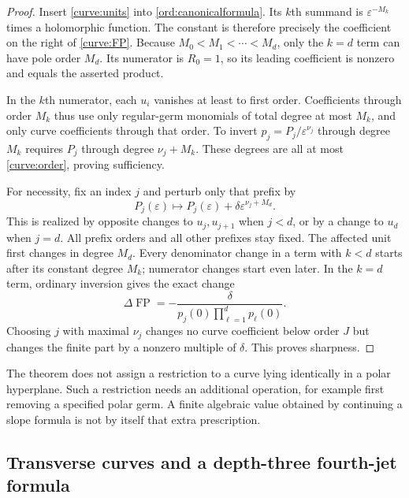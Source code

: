 \documentclass[11pt,letterpaper]{article}
\numberwithin{equation}{section}
\theoremstyle{definition}
\theoremstyle{remark}
\DeclareMathOperator{\FP}{FP}
\newcommand{\eps}{\varepsilon}
\begin{document}
\begin{proof}
Insert \eqref{curve:units} into \eqref{ord:canonicalformula}. Its $k$th
summand is $\eps^{-M_k}$ times a holomorphic function. The constant is
therefore precisely the coefficient on the right of \eqref{curve:FP}.
Because $M_0<M_1<\cdots<M_d$, only the $k=d$ term can have pole order
$M_d$. Its numerator is $R_0=1$, so its leading coefficient is nonzero
and equals the asserted product.

In the $k$th numerator, each $u_i$ vanishes at least to first order.
Coefficients through order $M_k$ thus use only regular-germ monomials
of total degree at most $M_k$, and only curve coefficients through
that order. To invert $p_j=P_j/\eps^{\nu_j}$ through degree $M_k$
requires $P_j$ through degree $\nu_j+M_k$. These degrees are all at
most \eqref{curve:order}, proving sufficiency.

For necessity, fix an index $j$ and perturb only that prefix by
\begin{equation}\label{curve:perturb}
 P_j(\eps)\longmapsto P_j(\eps)+
                       \delta\eps^{\nu_j+M_d}.
\end{equation}
This is realized by opposite changes to $u_j,u_{j+1}$ when $j<d$,
or by a change to $u_d$ when $j=d$. All prefix orders and all other
prefixes stay fixed. The affected unit first changes in degree $M_d$.
Every denominator change in a term with $k<d$ starts after its constant
degree $M_k$; numerator changes start even later. In the $k=d$ term,
ordinary inversion gives the exact change
\begin{equation}\label{curve:sharpchange}
 \Delta\FP=-\frac{\delta}
 {p_j(0)\prod_{\ell=1}^d p_\ell(0)}.
\end{equation}
Choosing $j$ with maximal $\nu_j$ changes no curve coefficient below
order $J$ but changes the finite part by a nonzero multiple of
$\delta$. This proves sharpness.
\end{proof}

The theorem does not assign a restriction to a curve lying identically
in a polar hyperplane. Such a restriction needs an additional
operation, for example first removing a specified polar germ. A
finite algebraic value obtained by continuing a slope formula is not
by itself that extra prescription.

\subsection{Transverse curves and a depth-three fourth-jet formula}
\end{document}
